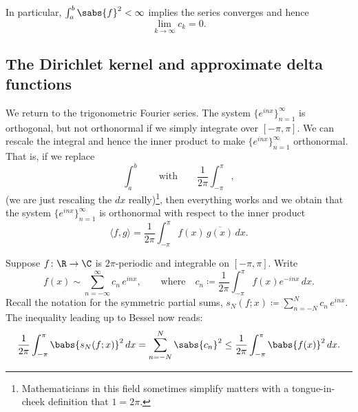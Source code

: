 In particular, $\int_a^b \sabs{f}^2 < \infty$ implies the series
converges and hence
\begin{equation*}
\lim_{k \to \infty} c_k = 0 .
\end{equation*}

\subsection{The Dirichlet kernel and approximate delta functions}

We return to the trigonometric Fourier series.
The system $\{ e^{inx} \}_{n=1}^\infty$ is orthogonal, but not orthonormal if we simply
integrate over $[-\pi,\pi]$.  We can rescale the integral
and hence the inner product to make 
$\{ e^{inx} \}_{n=1}^\infty$ orthonormal.  That is, if we replace
\begin{equation*}
\int_a^b \qquad \text{with} \qquad
\frac{1}{2\pi} \int_{-\pi}^\pi,
\end{equation*}
(we are just rescaling the $dx$ really)\footnote{%
Mathematicians in this field sometimes simplify matters with
a tongue-in-cheek definition that $1=2\pi$.},
then everything works and we obtain that the system
$\{ e^{inx} \}_{n=1}^\infty$
is orthonormal with respect to the inner product
\begin{equation*}
\langle f , g \rangle =
\frac{1}{2\pi} \int_{-\pi}^\pi f(x) \, \overline{g(x)} \, dx .
\end{equation*}

Suppose $f \colon \R \to \C$ is $2\pi$-periodic and integrable
on $[-\pi,\pi]$.
Write
\begin{equation*}
f(x) \sim
\sum_{n=-\infty}^\infty c_n \,e^{inx} ,
\qquad \text{where} \quad
c_n \coloneqq 
\frac{1}{2\pi} \int_{-\pi}^\pi
f(x) e^{-inx} \, dx .
\end{equation*}
Recall the notation for the symmetric partial sums,
$s_N(f;x) \coloneqq 
\sum_{n=-N}^N c_n \,e^{inx}$.
The inequality leading up to Bessel now reads:
\begin{equation*}
\frac{1}{2\pi} \int_{-\pi}^\pi
\babs{s_N(f;x)}^2 \, dx =
\sum_{n=-N}^N \sabs{c_n}^2
\leq
\frac{1}{2\pi} \int_{-\pi}^\pi
\babs{f(x)}^2
\, dx .
\end{equation*}

